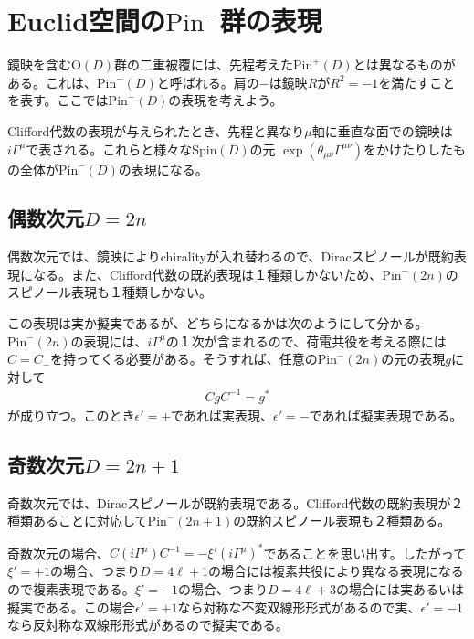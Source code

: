 \documentclass[12pt,a4paper]{jlreq}
\newcommand{\Pin}{\mathrm{Pin}^{+}}
\newcommand{\Pim}{\mathrm{Pin}^{-}}
\begin{document}
\section{Euclid空間の$\Pim$群の表現}
鏡映を含むO$(D)$群の二重被覆には、先程考えた$\Pin(D)$とは異なるものがある。これは、$\Pim(D)$と呼ばれる。肩の$-$は鏡映$R$が$R^2=-1$を満たすことを表す。ここでは$\Pim(D)$の表現を考えよう。

Clifford代数の表現が与えられたとき、先程と異なり$\mu$軸に垂直な面での鏡映は$i\Gamma^{\mu}$で表される。これらと様々なSpin$(D)$の元
$\exp(\theta_{\mu\nu}\Gamma^{\mu\nu})$をかけたりしたもの全体が$\Pim(D)$の表現になる。

\subsection{偶数次元$D=2n$}
偶数次元では、鏡映によりchiralityが入れ替わるので、Diracスピノールが既約表現になる。また、Clifford代数の既約表現は１種類しかないため、$\Pim(2n)$のスピノール表現も１種類しかない。

この表現は実か擬実であるが、どちらになるかは次のようにして分かる。$\Pim(2n)$の表現には、$i\Gamma^{\mu}$の１次が含まれるので、荷電共役を考える際には$C=C_{-}$を持ってくる必要がある。そうすれば、任意の$\Pim(2n)$の元の表現$g$に対して
\begin{align*}
  CgC^{-1}=g^*
\end{align*}
が成り立つ。このとき$\epsilon'=+$であれば実表現、$\epsilon'=-$であれば擬実表現である。

\subsection{奇数次元$D=2n+1$}
奇数次元では、Diracスピノールが既約表現である。Clifford代数の既約表現が２種類あることに対応して$\Pim(2n+1)$の既約スピノール表現も２種類ある。

奇数次元の場合、$C (i\Gamma^{\mu})C^{-1}=-\xi' (i\Gamma^{\mu})^*$であることを思い出す。したがって$\xi'=+1$の場合、つまり$D=4\ell+1$の場合には複素共役により異なる表現になるので複素表現である。$\xi'=-1$の場合、つまり$D=4\ell+3$の場合には実あるいは擬実である。この場合$\epsilon'=+1$なら対称な不変双線形形式があるので実、$\epsilon'=-1$なら反対称な双線形形式があるので擬実である。
\end{document}
